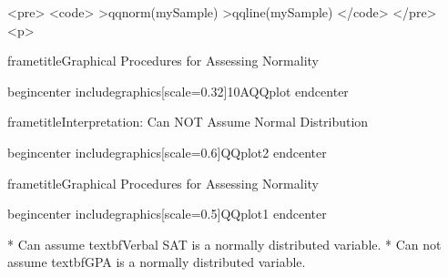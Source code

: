 <pre>
<code>
>qqnorm(mySample)
>qqline(mySample)
</code>
</pre>
<p>




frametitle{Graphical Procedures for Assessing Normality}

begin{center}
includegraphics[scale=0.32]{10AQQplot}
end{center}




frametitle{Interpretation: Can NOT Assume Normal Distribution}

begin{center}
includegraphics[scale=0.6]{QQplot2}
end{center}




frametitle{Graphical Procedures for Assessing Normality}

begin{center}
includegraphics[scale=0.5]{QQplot1}
end{center}

 * Can assume textbf{Verbal SAT} is a normally distributed variable.
 * Can not assume textbf{GPA} is a normally distributed variable.

